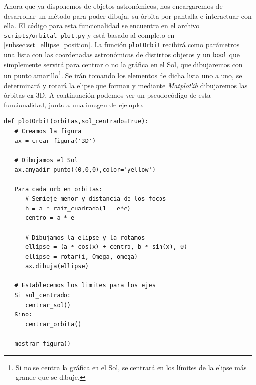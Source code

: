 \documentclass[11pt]{book}
\begin{document}
Ahora que ya disponemos de objetos astronómicos, nos encargaremos de desarrollar un método para poder dibujar su órbita por pantalla e interactuar con ella. El código para esta funcionalidad se encuentra en el archivo \texttt{scripts/orbital\_plot.py} y está basado al completo en \ref{subsec:set_ellipse_position}. La función \texttt{plotOrbit} recibirá como parámetros una lista con las coordenadas astronómicas de distintos objetos y un \texttt{bool} que simplemente servirá para centrar o no la gráfica en el Sol, que dibujaremos con un punto amarillo\footnote{Si no se centra la gráfica en el Sol, se centrará en los límites de la elipse más grande que se dibuje.}. Se irán tomando los elementos de dicha lista uno a uno, se determinará y rotará la elipse que forman y mediante \textit{Matplotlib} dibujaremos las órbitas en 3D. A continuación podemos ver un pseudocódigo de esta funcionalidad, junto a una imagen de ejemplo:
\begin{lstlisting}[style=PythonCode]
def plotOrbit(orbitas,sol_centrado=True):
   # Creamos la figura
   ax = crear_figura('3D')
   
   # Dibujamos el Sol
   ax.anyadir_punto((0,0,0),color='yellow')
   
   Para cada orb en orbitas:
      # Semieje menor y distancia de los focos
      b = a * raiz_cuadrada(1 - e*e)
      centro = a * e
      
      # Dibujamos la elipse y la rotamos
      ellipse = (a * cos(x) + centro, b * sin(x), 0)
      ellipse = rotar(i, Omega, omega)
      ax.dibuja(ellipse)
   
   # Establecemos los limites para los ejes
   Si sol_centrado:
      centrar_sol()
   Sino:
      centrar_orbita()
      
   mostrar_figura()
\end{lstlisting}
\end{document}
